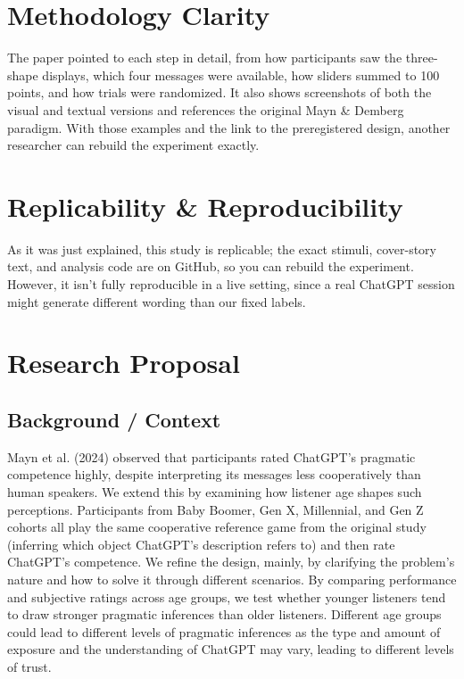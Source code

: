 \documentclass[12pt]{article}
\begin{document}
\section{Methodology Clarity}
The paper pointed to each step in detail, from how participants saw the three-shape displays, which four messages were available, how sliders summed to 100 points, and how trials were randomized. It also shows screenshots of both the visual and textual versions and references the original Mayn \& Demberg paradigm. With those examples and the link to the preregistered design, another researcher can rebuild the experiment exactly.

\section{Replicability \& Reproducibility}
As it was just explained, this study is replicable; the exact stimuli, cover-story text, and analysis code are on GitHub, so you can rebuild the experiment. However, it isn’t fully reproducible in a live setting, since a real ChatGPT session might generate different wording than our fixed labels.



\section{Research Proposal}

\subsection{Background / Context}

Mayn et al. (2024) observed that participants rated ChatGPT’s pragmatic competence highly, despite interpreting its messages less cooperatively than human speakers. We extend this by examining how listener age shapes such perceptions. Participants from Baby Boomer, Gen X, Millennial, and Gen Z cohorts all play the same cooperative reference game from the original study (inferring which object ChatGPT’s description refers to) and then rate ChatGPT’s competence. We refine the design, mainly, by clarifying the problem's nature and how to solve it through different scenarios. By comparing performance and subjective ratings across age groups, we test whether younger listeners tend to draw stronger pragmatic inferences than older listeners. Different age groups could lead to different levels of pragmatic inferences as the type and amount of exposure and the understanding of ChatGPT may vary, leading to different levels of trust.
\end{document}
